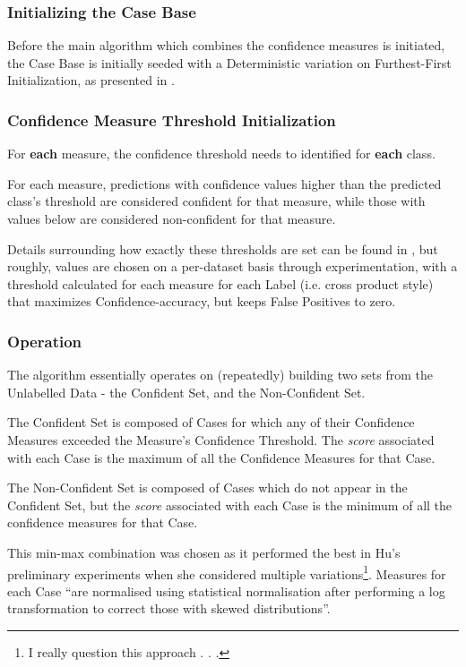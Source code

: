 \documentclass[a4paper,11pt]{report}
\begin{document}
\subsubsection{Initializing the Case Base}
Before the main algorithm which combines the confidence measures is initiated, the Case Base is initially seeded with a Deterministic variation on Furthest-First Initialization, as presented in \citet{Greene2007}.

\subsubsection{Confidence Measure Threshold Initialization}
For \textbf{each} measure, the confidence threshold needs to identified for \textbf{each} class.

For each measure, predictions with confidence values higher than the predicted class's threshold are considered confident for that measure, while those with values below are considered non-confident for that measure.

Details surrounding how exactly these thresholds are set can be found in \citet{Delany2005}, but roughly, values are chosen on a per-dataset basis through experimentation, with a threshold calculated for each measure for each Label (i.e. cross product style) that maximizes Confidence-accuracy, but keeps False Positives to zero.

\subsubsection{Operation}
The algorithm essentially operates on (repeatedly) building two sets from the Unlabelled Data - the Confident Set, and the Non-Confident Set.

The Confident Set is composed of Cases for which any of their Confidence Measures exceeded the Measure's Confidence Threshold. The \emph{score} associated with each Case is the maximum of all the Confidence Measures for that Case.

The Non-Confident Set is composed of Cases which do not appear in the Confident Set, but the \emph{score} associated with each Case is the minimum of all the confidence measures for that Case. 

This min-max combination was chosen as it performed the best in Hu's preliminary experiments when she considered multiple variations\footnote{I really question this approach . . .}. Measures for each Case ``are normalised using statistical normalisation after performing a log transformation to correct those with skewed distributions''\citep{Hu2011}.
\end{document}

